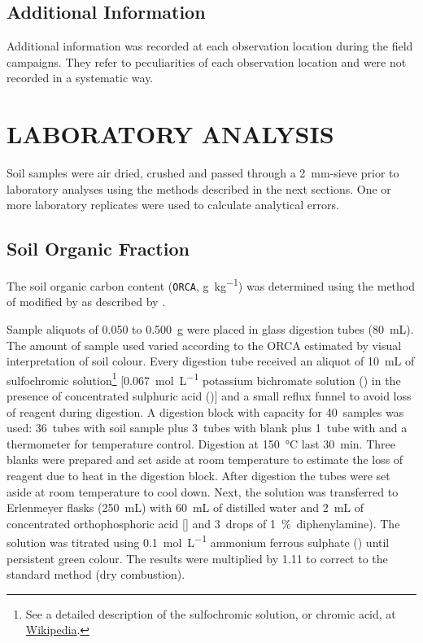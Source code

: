 \subsection{Additional Information}

Additional information was recorded at each observation location during the field campaigns. They refer to 
peculiarities of each observation location and were not recorded in a systematic way.

\section{LABORATORY ANALYSIS}
\label{sec:chap04-laboratory}

Soil samples were air dried, crushed and passed through a \SI{2}{\milli\metre}-sieve prior to laboratory 
analyses using the methods described in the next sections. One or more laboratory replicates were used to 
calculate analytical errors.

\subsection{Soil Organic Fraction}
\label{sec:chap04-organic}

The soil organic carbon content (\texttt{ORCA}, \si{\gram\per\kilo\gram}) was determined using the method of
 modified by  as described by .

\def\footsulfochromic{\footnote{See a detailed description of the sulfochromic solution, or chromic acid, at 
\href{http://en.wikipedia.org/wiki/Chromic_acid}{Wikipedia}.}}

Sample aliquots of \num{0.050} to \SI{0.500}{\gram} were placed in glass digestion tubes 
(\SI{80}{\milli\liter}). The amount of sample used varied according to the ORCA estimated by visual 
interpretation of soil colour. Every digestion tube received an aliquot of \SI{10}{\milli\liter} of 
sulfochromic solution\footsulfochromic{} [\SI{0.067}{\mole\per\liter} potassium bichromate solution
() in the presence of concentrated sulphuric acid ()] and a small reflux funnel 
to avoid loss of reagent during digestion. A digestion block with capacity for \num{40}~samples was used:
\num{36}~tubes with soil sample plus \num{3}~tubes with blank plus \num{1}~tube with  and a
thermometer for temperature control. Digestion at \SI{150}{\celsius} last \SI{30}{\minute}. Three blanks 
were prepared and set aside at room temperature to estimate the loss of reagent due to heat in the digestion 
block. After digestion the tubes were set aside at room temperature to cool down. Next, the solution was 
transferred to Erlenmeyer flasks (\SI{250}{\milli\liter}) with \SI{60}{\milli\liter} of distilled water and
\SI{2}{\milli\liter} of concentrated orthophosphoric acid [] and \num{3}~drops of 
\SI{1}{\percent}~diphenylamine). The solution was titrated using \SI{0.1}{\mole\per\liter} ammonium ferrous
sulphate () until persistent green colour. The results were multiplied by \num{1.11}
to correct to the standard method (dry combustion).

